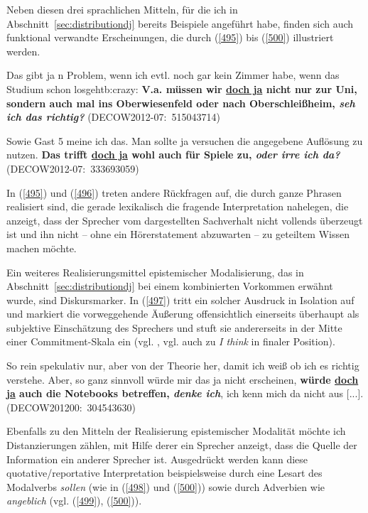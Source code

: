 Neben diesen drei sprachlichen Mitteln, für die ich in Abschnitt~\ref{sec:distributiondj} bereits Beispie\-le angeführt habe, finden sich auch funktional verwandte Erscheinungen, die durch (\ref{495}) bis (\ref{500}) illustriert werden.

\begin{exe}
	\ex\label{495} 
	\scriptsize
	Das gibt ja n Problem, wenn ich evtl. noch gar kein Zimmer habe, wenn das Studium schon losgehtb:crazy: \textbf{V.a. müssen wir \underline{doch ja} 		nicht nur zur Uni, sondern auch mal ins Oberwiesenfeld oder nach Oberschleißheim, \textit{seh ich das richtig?}}
	\hfill\hbox{(DECOW2012-07: 515043714)}	
\end{exe}

\begin{exe}
	\ex\label{496} 
	\scriptsize
	Sowie Gast 5 meine ich das. Man sollte ja versuchen die angegebene Auflösung zu nutzen. \textbf{Das trifft \underline{doch ja} wohl auch für Spiele 		zu, \textit{\textbf{oder irre ich da?}}}   
	\hfill\hbox{(DECOW2012-07: 333693059)}	
\end{exe}
In (\ref{495}) und (\ref{496}) treten andere Rückfragen  auf, die durch ganze Phrasen realisiert sind, die gerade lexikalisch die fragende Interpretation nahelegen, die anzeigt, dass der Sprecher vom dargestellten Sachverhalt nicht vollends überzeugt ist und ihn nicht – ohne ein Hörerstatement abzuwarten – zu geteiltem Wissen machen möchte. 

Ein weiteres Realisierungsmittel epistemischer Modalisierung, das in Ab\-schnitt~\ref{sec:distributiondj} bei einem kombinierten Vorkommen erwähnt wurde, sind  Diskursmarker. In (\ref{497}) tritt ein solcher Ausdruck in Isolation auf und markiert die vorweggehende Äußerung offensichtlich einerseits überhaupt als subjektive Einschätzung des Sprechers und stuft sie andererseits in der Mitte einer Commitment-Skala ein (vgl. \citealt[18]{Aijmer1997}, vgl. auch \citeyear[24]{Aijmer1997} zu \textit{I think} in finaler Position).	

\begin{exe}
	\ex\label{497} 
	\scriptsize
	So rein spekulativ nur, aber von der Theorie her, damit ich weiß ob ich es richtig verstehe. Aber, so ganz sinnvoll würde mir das ja nicht erscheinen, 	\textbf{würde \underline{doch ja} auch die Notebooks betreffen, \textit{denke ich}}, ich kenn mich da nicht aus $[$...$]$.  
	\hfill\hbox{(DECOW201200: 304543630)}	
\end{exe}
Ebenfalls zu den Mitteln der Realisierung epistemischer Modalität möchte ich Distanzierungen zählen, mit Hilfe derer ein Sprecher anzeigt, dass die Quelle der Information ein anderer Sprecher ist. Ausgedrückt werden kann diese  quotative/reportative Interpretation beispielsweise durch eine Lesart des Modalverbs \textit{sollen} (wie in (\ref{498}) und (\ref{500})) sowie durch Adverbien wie \textit{angeblich} (vgl. (\ref{499}), (\ref{500})).

